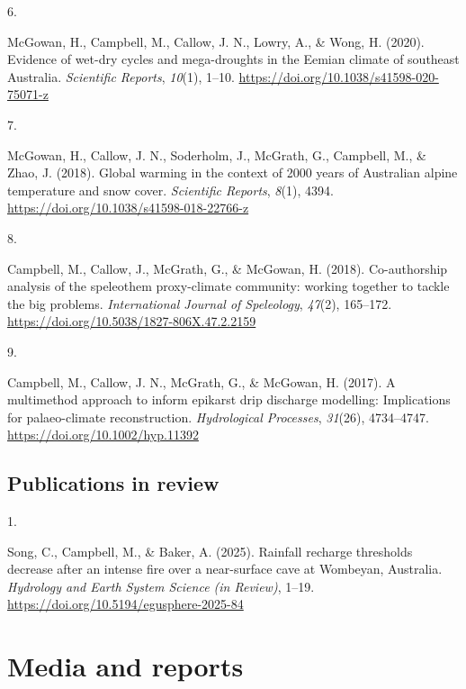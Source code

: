 \documentclass[11pt,a4paper,]{moderncv}
\newlength{\csllabelwidth}
\newcommand{\CSLLeftMargin}[1]{\parbox[t]{\csllabelwidth}{#1}}
\newcommand{\CSLRightInline}[1]{\parbox[t]{\linewidth - \csllabelwidth}{#1}}
\begin{document}
\leavevmode{}%
\CSLLeftMargin{6. }%
\CSLRightInline{McGowan, H., Campbell, M., Callow, J. N., Lowry, A., \&
Wong, H. (2020). Evidence of wet-dry cycles and mega-droughts in the
Eemian climate of southeast Australia. \emph{Scientific Reports},
\emph{10}(1), 1--10. \url{https://doi.org/10.1038/s41598-020-75071-z}}

\leavevmode{}%
\CSLLeftMargin{7. }%
\CSLRightInline{McGowan, H., Callow, J. N., Soderholm, J., McGrath, G.,
Campbell, M., \& Zhao, J. (2018). Global warming in the context of 2000
years of Australian alpine temperature and snow cover. \emph{Scientific
Reports}, \emph{8}(1), 4394.
\url{https://doi.org/10.1038/s41598-018-22766-z}}

\leavevmode{}%
\CSLLeftMargin{8. }%
\CSLRightInline{Campbell, M., Callow, J., McGrath, G., \& McGowan, H.
(2018). Co-authorship analysis of the speleothem proxy-climate
community: working together to tackle the big problems.
\emph{International Journal of Speleology}, \emph{47}(2), 165--172.
\url{https://doi.org/10.5038/1827-806X.47.2.2159}}

\leavevmode{}%
\CSLLeftMargin{9. }%
\CSLRightInline{Campbell, M., Callow, J. N., McGrath, G., \& McGowan, H.
(2017). A multimethod approach to inform epikarst drip discharge
modelling: Implications for palaeo-climate reconstruction.
\emph{Hydrological Processes}, \emph{31}(26), 4734--4747.
\url{https://doi.org/10.1002/hyp.11392}}

\hypertarget{publications-in-review}{%
\subsection{Publications in review}\label{publications-in-review}}

\hypertarget{bibliography}{}
\leavevmode{}%
\CSLLeftMargin{1. }%
\CSLRightInline{Song, C., Campbell, M., \& Baker, A. (2025). Rainfall
recharge thresholds decrease after an intense fire over a near-surface
cave at Wombeyan, Australia. \emph{Hydrology and Earth System Science
(in Review)}, 1--19. \url{https://doi.org/10.5194/egusphere-2025-84}}

\hypertarget{media-and-reports}{%
\section{Media and reports}\label{media-and-reports}}
\end{document}
